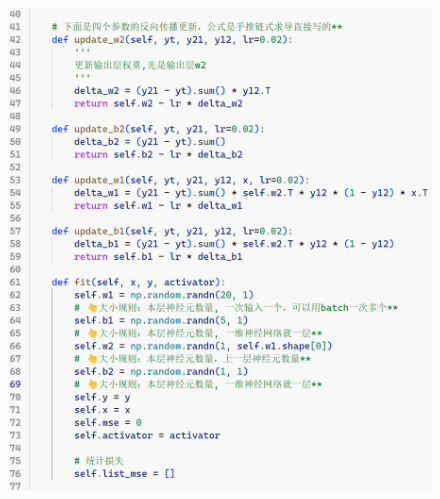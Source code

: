 \documentclass[a5paper, 11pt, openany]{book}
\begin{document}
\begin{figure}[h!]
    \centering
    \includegraphics[width=\textwidth, frame]{figures/BP2.png}
\end{figure}

\newpage
\end{document}
